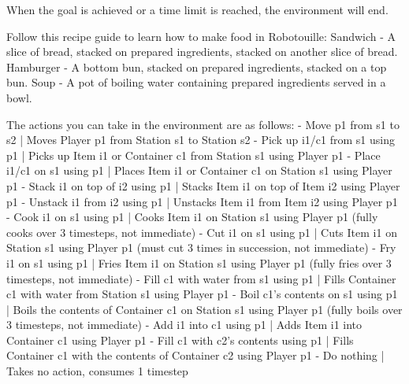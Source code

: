 When the goal is achieved or a time limit is reached, the environment will end.

Follow this recipe guide to learn how to make food in Robotouille:
    Sandwich - A slice of bread, stacked on prepared ingredients, stacked on another slice of bread.
    Hamburger - A bottom bun, stacked on prepared ingredients, stacked on a top bun.
    Soup - A pot of boiling water containing prepared ingredients served in a bowl.

The actions you can take in the environment are as follows:
    - Move {p1} from {s1} to {s2} | Moves Player {p1} from Station {s1} to Station {s2}
    - Pick up {i1/c1} from {s1} using {p1} | Picks up Item {i1} or Container {c1} from Station {s1} using Player {p1}
    - Place {i1/c1} on {s1} using {p1} | Places Item {i1} or Container {c1} on Station {s1} using Player {p1}
    - Stack {i1} on top of {i2} using {p1} | Stacks Item {i1} on top of Item {i2} using Player {p1}
    - Unstack {i1} from {i2} using {p1} | Unstacks Item {i1} from Item {i2} using Player {p1}
    - Cook {i1} on {s1} using {p1} | Cooks Item {i1} on Station {s1} using Player {p1} (fully cooks over 3 timesteps, not immediate)
    - Cut {i1} on {s1} using {p1} | Cuts Item {i1} on Station {s1} using Player {p1} (must cut 3 times in succession, not immediate)
    - Fry {i1} on {s1} using {p1} | Fries Item {i1} on Station {s1} using Player {p1} (fully fries over 3 timesteps, not immediate)
    - Fill {c1} with water from {s1} using {p1} | Fills Container {c1} with water from Station {s1} using Player {p1}
    - Boil {c1}'s contents on {s1} using {p1} | Boils the contents of Container {c1} on Station {s1} using Player {p1} (fully boils over 3 timesteps, not immediate)
    - Add {i1} into {c1} using {p1} | Adds Item {i1} into Container {c1} using Player {p1}
    - Fill {c1} with {c2}'s contents using {p1} | Fills Container {c1} with the contents of Container {c2} using Player {p1}
    - Do nothing | Takes no action, consumes 1 timestep